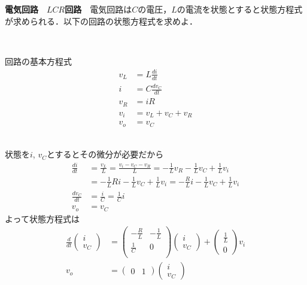 \documentclass[a4paper,11pt,fleqn]{jreport}
\begin{document}
\newpage

\noindent
{\bf 電気回路　$LCR$回路}　電気回路は$C$の電圧，$L$の電流を状態とすると状態方程式が求められる．以下の回路の状態方程式を求めよ．

\begin{minipage}{100mm}
\end{minipage}
\begin{minipage}{50mm}
回路の基本方程式
\begin{align*}
	v_L & = L \frac{d i}{dt} \\
	i & = C \frac{d v_C}{dt} \\
	v_R &= i R \\
	v_i & = v_L + v_C + v_R \\
	v_o & = v_C
\end{align*}
\end{minipage}
\ \\[1cm]

状態を$i$, $v_C$とするとその微分が必要だから
\begin{align*}
	\frac{d i}{dt} 
	&= \frac{v_L}{L} 
	= \frac{v_i - v_C - v_R}{L} 
	= - \frac{1}{L} v_R - \frac{1}{L} v_C + \frac{1}{L} v_i 
\\ &
	= - \frac{1}{L} R i - \frac{1}{L} v_C + \frac{1}{L} v_i 
	= - \frac{R}{L} i - \frac{1}{L} v_C + \frac{1}{L} v_i \\
	\frac{d v_C}{dt}
	&= \frac{i}{C} 
	= \frac{1}{C} i \\
	v_o &= v_C 
\end{align*}
よって状態方程式は
\begin{align*}
	\frac{d}{dt}
	\left (
	\begin{array}{c}
		i \\
		v_C
	\end{array}
	\right )
	&=
	\left (
	\begin{array}{cc}
		-\frac{R}{L} & -\frac{1}{L} \\
		\frac{1}{C} & 0 \\
	\end{array}
	\right )
	\left (
	\begin{array}{c}
		i \\
		v_C
	\end{array}
	\right )
	+
	\left (
	\begin{array}{c}
		\frac{1}{L} \\
		0
	\end{array}
	\right )
	v_i
\\
	v_o 
	&=
	\left (
	\begin{array}{cc}
		0 & 1 
	\end{array}
	\right )
	\left (
	\begin{array}{c}
		i \\
		v_C
	\end{array}
	\right )
\end{align*}
\end{document}
